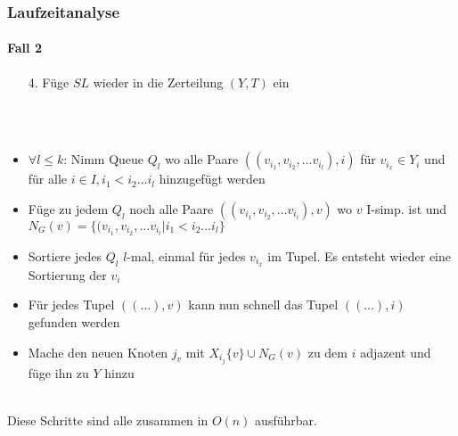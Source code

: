\begin{frame}
\frametitle{Laufzeitanalyse}
\framesubtitle{Fall 2}

\begin{enumerate}
	\item[4.] Füge $SL$ wieder in die Zerteilung $(Y,T)$ ein
\end{enumerate}
\ \\
\ \\

\begin{itemize}
	\item $\forall l \leq k$: Nimm Queue $Q_l$ wo alle Paare $((v_{i_1}, v_{i_2}, \dots v_{i_l}), i)$ für $v_{i_x} \in Y_i$ und für alle $i \in I, i_1 < i_2 \dots i_l$ hinzugefügt werden
	\item Füge zu jedem $Q_l$ noch alle Paare $((v_{i_1}, v_{i_2}, \dots v_{i_l}), v)$ wo $v$ I-simp. ist und $N_G(v) = \{ (v_{i_1}, v_{i_2}, \dots v_{i_l} | i_1 < i_2 \dots i_l \}$
	\item Sortiere jedes $Q_l$ $l$-mal, einmal für jedes $v_{i_x}$ im Tupel. Es entsteht wieder eine Sortierung der $v_i$
	\item Für jedes Tupel $((\dots), v)$ kann nun schnell das Tupel $((\dots), i)$ gefunden werden
	\item Mache den neuen Knoten $j_v$ mit $X_{i_j} \{ v \} \cup N_G(v)$ zu dem $i$ adjazent und füge ihn zu $Y$ hinzu
\end{itemize}
\ \\
Diese Schritte sind alle zusammen in $O(n)$ ausführbar.
\end{frame}







